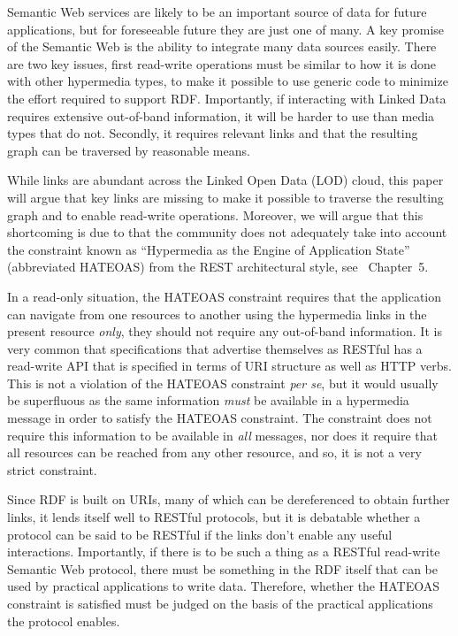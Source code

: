 \documentclass{llncs}
\begin{document}
Semantic Web services are likely to be an important source of data for
future applications, but for foreseeable future they are just one of many. A
key promise of the Semantic Web is the ability to integrate many data
sources easily. There are two key issues, first read-write operations
must be similar to how it is done with other hypermedia types, to make
it possible to use generic code to minimize the effort required to
support RDF. Importantly, if interacting with Linked Data requires
extensive out-of-band information, it will be harder to use than media
types that do not. Secondly, it requires relevant links and that the
resulting graph can be traversed by reasonable means.

While links are abundant across the Linked Open Data (LOD) cloud, this
paper will argue that key links are missing to make it possible to
traverse the resulting graph and to enable read-write
operations. Moreover, we will argue that this shortcoming is due to
that the community does not adequately take into account the
constraint known as ``Hypermedia as the Engine of Application State''
(abbreviated HATEOAS) from the REST architectural style, see
\cite{Fielding_2000_Architectural-Styles}~Chapter~5.

In a read-only situation, the HATEOAS constraint requires that the
application can navigate from one resources to another using the
hypermedia links in the present resource \emph{only}, they should not
require any out-of-band information. It is very common that
specifications that advertise themselves as RESTful has a read-write
API that is specified in terms of URI structure as well as HTTP
verbs. This is not a violation of the HATEOAS constraint \textit{per
  se}, but it would usually be superfluous as the same information
\emph{must} be available in a hypermedia message in order to satisfy
the HATEOAS constraint. The constraint does not require this
information to be available in \emph{all} messages, nor does it
require that all resources can be reached from any other resource, and
so, it is not a very strict constraint.



Since RDF is built on URIs, many of which can be dereferenced to
obtain further links, it lends itself well to RESTful protocols, but
it is debatable whether a protocol can be said to be RESTful if the
links don't enable any useful interactions. Importantly, if there is
to be such a thing as a RESTful read-write Semantic Web protocol,
there must be something in the RDF itself that can be used by
practical applications to write data. Therefore, whether the HATEOAS
constraint is satisfied must be judged on the basis of the practical
applications the protocol enables.
\end{document}
